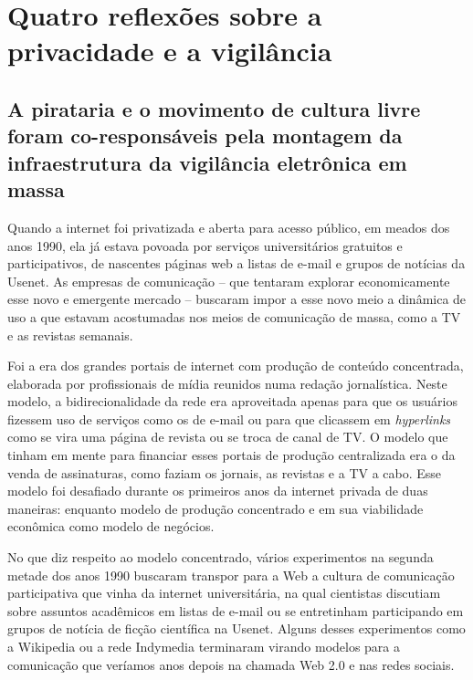 \chapter{Quatro reflexões sobre a privacidade e a
vigilância}\label{quatro-reflexuxf5es-sobre-a-privacidade-e-a-vigiluxe2ncia}

\section{A pirataria e o movimento de cultura livre foram co-responsáveis
pela montagem da infraestrutura da vigilância eletrônica em massa}

Quando a internet foi privatizada e aberta para acesso público, em
meados dos anos 1990, ela já estava povoada por serviços universitários
gratuitos e participativos, de nascentes páginas web a listas de e-mail
e grupos de notícias da Usenet. As empresas de comunicação -- que
tentaram explorar economicamente esse novo e emergente mercado --
buscaram impor a esse novo meio a dinâmica de uso a que estavam
acostumadas nos meios de comunicação de massa, como a TV e as revistas
semanais.

Foi a era dos grandes portais de internet com produção de conteúdo
concentrada, elaborada por profissionais de mídia reunidos numa redação
jornalística. Neste modelo, a bidirecionalidade da rede era aproveitada
apenas para que os usuários fizessem uso de serviços como os de e-mail
ou para que clicassem em \emph{hyperlinks} como se vira uma página de
revista ou se troca de canal de TV. O modelo que tinham em mente para
financiar esses portais de produção centralizada era o da venda de
assinaturas, como faziam os jornais, as revistas e a TV a cabo. Esse
modelo foi desafiado durante os primeiros anos da internet privada de
duas maneiras: enquanto modelo de produção concentrado e em sua
viabilidade econômica como modelo de negócios.

No que diz respeito ao modelo concentrado, vários experimentos na
segunda metade dos anos 1990 buscaram transpor para a Web a cultura de
comunicação participativa que vinha da internet universitária, na qual
cientistas discutiam sobre assuntos acadêmicos em listas de e-mail ou se
entretinham participando em grupos de notícia de ficção científica na
Usenet. Alguns desses experimentos como a Wikipedia ou a rede Indymedia
terminaram virando modelos para a comunicação que veríamos anos depois
na chamada Web 2.0 e nas redes sociais.

